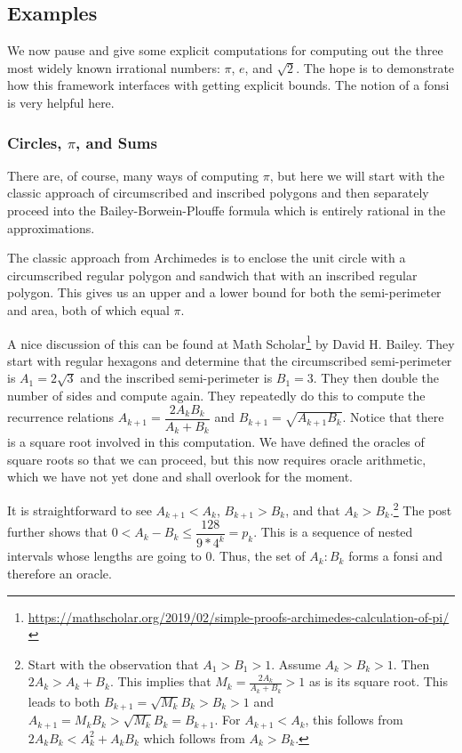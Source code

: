 \documentclass[12pt]{article}
\theoremstyle{remark}
\begin{document}
\subsection{Examples}


We now pause and give some explicit computations for computing out the three most widely known irrational numbers: $\pi$, $e$, and $\sqrt{2}$. The hope is to demonstrate how this framework interfaces with getting explicit bounds. The notion of a fonsi is very helpful here. 

\subsubsection{Circles, $\pi$, and Sums}

There are, of course, many ways of computing $\pi$, but here we will start with the classic approach of circumscribed and inscribed polygons and then separately proceed into the Bailey-Borwein-Plouffe formula which is entirely rational in the approximations. 

The classic approach from Archimedes is to enclose the unit circle with a circumscribed regular polygon and sandwich that with an inscribed regular polygon. This gives us an upper and a lower bound for both the semi-perimeter and area, both of which equal $\pi$. 

A nice discussion of this can be found at Math Scholar\footnote{\url{https://mathscholar.org/2019/02/simple-proofs-archimedes-calculation-of-pi/}} by David H. Bailey. They start with regular hexagons and determine that the circumscribed semi-perimeter is $A_1 = 2 \sqrt{3}$ and the inscribed semi-perimeter is $B_1 = 3$. They then double the number of sides and compute again. They repeatedly do this to compute the recurrence relations $A_{k+1} = \dfrac{2A_k B_k}{A_k + B_k}$ and $B_{k+1} = \sqrt{A_{k+1}B_k}$. Notice that there is a square root involved in this computation. We have defined the oracles of square roots so that we can proceed, but this now requires oracle arithmetic, which we have not yet done and shall overlook for the moment.  

It is straightforward to see $A_{k+1} < A_k$, $B_{k+1} > B_k$, and that $A_k > B_k$.\footnote{Start with the observation that $A_1 > B_1 > 1$. Assume $A_k > B_k > 1$. Then $2 A_k  > A_k + B_k$. This implies that $M_k = \frac{2A_k}{A_k + B_k}>1$ as is its square root. This leads to both $B_{k+1} = \sqrt{M_k} B_k > B_k > 1$  and $A_{k+1} = M_k B_k > \sqrt{M_k} B_k = B_{k+1}$.  For $A_{k+1} < A_k$, this follows from $2A_k B_k < A_k^2 + A_kB_k$ which follows from $A_k > B_k$.} The post further shows that $0 < A_k - B_k \leq \dfrac{128}{9*4^k} = p_k $. This is a sequence of nested intervals whose lengths are going to 0. Thus, the set of $A_k:B_k$ forms a fonsi and therefore an oracle. 
\end{document}

